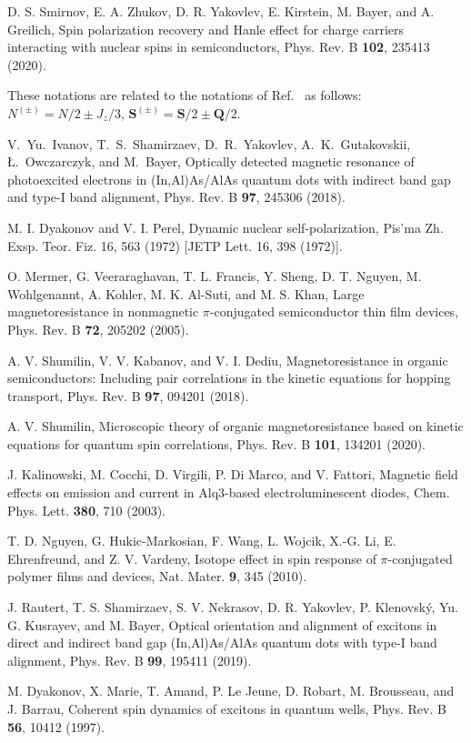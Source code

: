 \documentclass[twocolumn,showpacs,preprintnumbers,amsmath,amssymb,aps]{revtex4-1}
\begin{document}
\begin{thebibliography}{}
 D. S. Smirnov, E. A. Zhukov, D. R. Yakovlev, E. Kirstein, M. Bayer, and A. Greilich, Spin polarization recovery and Hanle effect for charge carriers interacting with nuclear spins in semiconductors, Phys. Rev. B \textbf{102}, 235413 (2020).

 These notations are related to the notations of Ref.~\cite{Smirnov125} as follows: $N^{(\pm)}=N/2\pm J_z/3$, $\bm S^{(\pm)}=\bm S/2\pm\bm Q/2$.

 V.~Yu.~Ivanov, T.~S.~Shamirzaev, D.~R.~Yakovlev, A.~K.~Gutakovskii, {\L}.~Owczarczyk, and M.~Bayer, Optically detected magnetic resonance of photoexcited electrons in (In,Al)As/AlAs quantum dots with indirect band gap and type-I band alignment,
Phys. Rev. B \textbf{97}, 245306 (2018).

 M. I. Dyakonov and V. I. Perel, Dynamic nuclear self-polarization, Pis'ma Zh. Exsp. Teor. Fiz. 16, 563 (1972) [JETP Lett. 16, 398 (1972)].

 O. Mermer, G. Veeraraghavan, T. L. Francis, Y. Sheng,
D. T. Nguyen, M. Wohlgenannt, A. Kohler, M. K. Al-Suti, and M. S. Khan,
Large magnetoresistance in nonmagnetic $\pi$-conjugated semiconductor thin film devices,
Phys. Rev. B {\bf 72}, 205202 (2005).

A. V. Shumilin, V. V. Kabanov, and V. I. Dediu, Magnetoresistance
in organic semiconductors: Including pair
correlations in the kinetic equations for hopping transport,
Phys. Rev. B {\bf 97}, 094201 (2018).

A. V. Shumilin, Microscopic theory of organic magnetoresistance
based on kinetic equations for quantum spin
correlations, Phys. Rev. B {\bf 101}, 134201 (2020).

J. Kalinowski, M. Cocchi, D. Virgili, P. Di Marco, and V. Fattori,
Magnetic field effects on emission and current in Alq3-based electroluminescent diodes,
Chem. Phys. Lett. {\bf 380}, 710 (2003).

T. D. Nguyen, G. Hukic-Markosian, F. Wang, L. Wojcik, X.-G.
Li, E. Ehrenfreund, and Z. V. Vardeny, Isotope effect in spin response
of $\pi$-conjugated polymer films and devices, Nat. Mater.
{\bf 9}, 345 (2010).




 J. Rautert, T. S. Shamirzaev, S. V. Nekrasov, D. R. Yakovlev, P. Klenovsk\'y, Yu. G. Kusrayev, and M. Bayer, Optical orientation and alignment of excitons in direct and indirect band gap (In,Al)As/AlAs quantum dots with type-I band alignment, Phys. Rev. B \textbf{99}, 195411 (2019).

 M. Dyakonov, X. Marie, T. Amand, P. Le Jeune, D.
Robart, M. Brousseau, and J. Barrau, Coherent spin dynamics
of excitons in quantum wells, Phys. Rev. B \textbf{56}, 10412 (1997).

\end{thebibliography}
\end{document}
